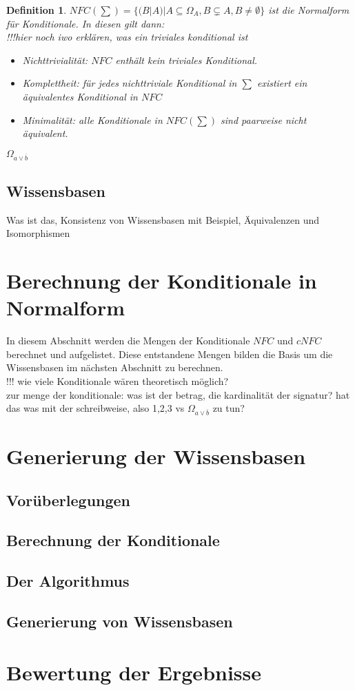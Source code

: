 \documentclass[12pt,a4paper]{article}
\newtheorem{theorem}{Definition}
\begin{document}
\begin{theorem}
$NFC(\sum) = \{(B|A)|A \subseteq \Omega_A, B \subsetneq A, B \neq \emptyset \}$ ist die Normalform für Konditionale. In diesen gilt dann:\\
 !!!hier noch iwo erklären, was ein triviales konditional ist \\

 
 \begin{itemize}
\item{Nichttrivialität: $NFC$ enthält kein triviales Konditional.}
\item{Komplettheit: für jedes nichttriviale Konditional in $\sum$ existiert ein äquivalentes Konditional in $NFC$ }
\item{Minimalität: alle Konditionale in $NFC(\sum)$ sind paarweise nicht äquivalent.}
\end{itemize}

\end{theorem}

$\Omega_{a\vee \overline{b}}$


\subsection{Wissensbasen}
Was ist das, Konsistenz von Wissensbasen mit Beispiel, Äquivalenzen und Isomorphismen

\section{Berechnung der Konditionale in Normalform}
In diesem Abschnitt werden die Mengen der Konditionale $NFC$ und $cNFC$ berechnet und aufgelistet. Diese entstandene Mengen bilden die Basis um die Wissensbasen im nächsten Abschnitt zu berechnen. \\
!!! wie viele Konditionale wären theoretisch möglich?  \\
zur menge der konditionale: was ist der betrag, die kardinalität der signatur? hat das was mit der schreibweise, also {1,2,3} vs $\Omega_{a \vee \overline{b}}$ zu tun?
\section{Generierung der Wissensbasen}
\subsection{Vorüberlegungen}
\subsection{Berechnung der Konditionale}
\subsection{Der Algorithmus}
\subsection{Generierung von Wissensbasen}
\section{Bewertung der Ergebnisse}

\newpage

 
\end{document}
